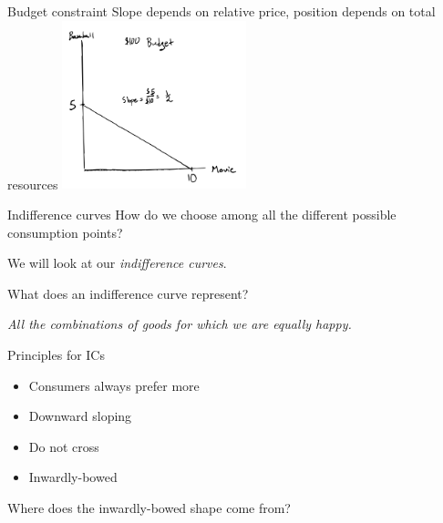 \documentclass[aspectratio=169]{beamer}
\begin{document}
\begin{frame}{Budget constraint}
    Slope depends on relative price, position depends on total resources
    \centering
        \includegraphics[width = 0.4\textwidth,keepaspectratio]{BC2.png}
\end{frame}


\begin{frame}{Indifference curves}
    How do we choose among all the different possible consumption points?

    \vspace{2mm}

    We will look at our \textit{indifference curves}.

    \vspace{2mm}

    What does an indifference curve represent?

    \vspace{2mm}
    \begin{center}
        \textit{All the combinations of goods for which we are equally happy.}
    \end{center}
\end{frame}

\begin{frame}{Principles for ICs}
    \begin{itemize}
        \item Consumers always prefer more
        \item Downward sloping
        \item Do not cross
        \item Inwardly-bowed
    \end{itemize}

    Where does the inwardly-bowed shape come from?
\end{frame}


\end{document}
